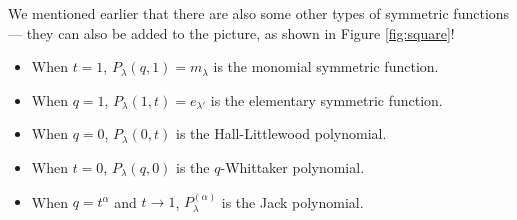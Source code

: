 \documentclass[a4paper,11pt]{amsart}
\begin{document}
		We mentioned earlier that there are also some other types of symmetric functions --- they can also be added to the picture, as shown in Figure \ref{fig:square}!
        \begin{itemize}
    	    \item When $t=1$, $P_\lambda(q,1)=m_\lambda$ is the monomial symmetric function.
    	    \item When $q=1$, $P_\lambda(1,t)=e_{\lambda'} $ is the elementary symmetric function.
    	    \item When $q=0$, $P_\lambda(0,t)$ is the Hall-Littlewood polynomial.
    	    \item When $t=0$, $P_\lambda(q,0)$ is the $q$-Whittaker polynomial.
    	    \item When $q=t^\alpha$ and $t \rightarrow 1$, $P_\lambda^{(\alpha)}$ is the Jack polynomial. 
        \end{itemize}		
\end{document}
